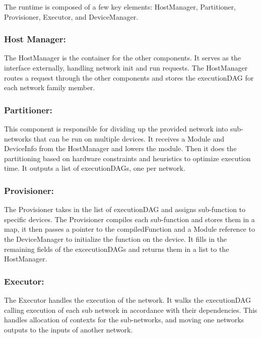 The runtime is composed of a few key elements\+: Host\+Manager, Partitioner, Provisioner, Executor, and Device\+Manager.



\subsubsection*{Host Manager\+:}

The Host\+Manager is the container for the other components. It serves as the interface externally, handling network init and run requests. The Host\+Manager routes a request through the other components and stores the execution\+D\+AG for each network family member.

\subsubsection*{Partitioner\+:}

This component is responsible for dividing up the provided network into sub-\/networks that can be run on multiple devices. It receives a Module and Device\+Info from the Host\+Manager and lowers the module. Then it does the partitioning based on hardware constraints and heuristics to optimize execution time. It outputs a list of execution\+D\+A\+Gs, one per network.

\subsubsection*{Provisioner\+:}

The Provisioner takes in the list of execution\+D\+AG and assigns sub-\/function to specific devices. The Provisioner compiles each sub-\/function and stores them in a map, it then passes a pointer to the compiled\+Function and a Module reference to the Device\+Manager to initialize the function on the device. It fills in the remaining fields of the excecution\+D\+A\+Gs and returns them in a list to the Host\+Manager.

\subsubsection*{Executor\+:}

The Executor handles the execution of the network. It walks the execution\+D\+AG calling execution of each sub network in accordance with their dependencies. This handles allocation of contexts for the sub-\/networks, and moving one network\textquotesingle{}s outputs to the inputs of another network.

